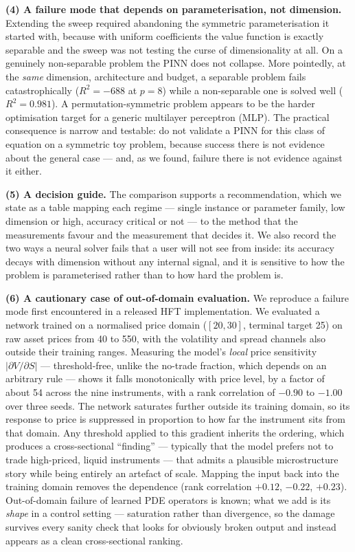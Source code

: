 \documentclass[conference]{IEEEtran}
\begin{document}
\textbf{(4) A failure mode that depends on parameterisation, not dimension.} Extending the sweep
required abandoning the symmetric parameterisation it started with, because with uniform
coefficients the value function is exactly separable and the sweep was not testing the
curse of dimensionality at all. On a genuinely non-separable problem the PINN does not collapse.
More pointedly, at the \emph{same} dimension, architecture and budget, a separable problem fails
catastrophically ($R^2 = -688$ at $p=8$) while a non-separable one is solved well
($R^2 = 0.981$). A permutation-symmetric problem appears to be the harder optimisation target for
a generic multilayer perceptron (MLP). The practical consequence is narrow and testable: do not
validate a PINN for this
class of equation on a symmetric toy problem, because success there is not evidence about the
general case --- and, as we found, failure there is not evidence against it either.

\textbf{(5) A decision guide.} The comparison supports a recommendation, which we state as a table
mapping each regime --- single instance or parameter family, low dimension or high, accuracy
critical or not --- to the method that the measurements favour and the measurement that decides it.
We also record the two ways a neural solver fails that a user will not see from inside: its
accuracy decays with dimension without any internal signal, and it is sensitive to how the problem
is parameterised rather than to how hard the problem is.

\textbf{(6) A cautionary case of out-of-domain evaluation.} We reproduce a failure mode first
encountered in a released HFT implementation. We evaluated a network trained on a normalised price
domain ($[20,30]$, terminal target 25) on raw asset prices from 40 to 550,
with the volatility and spread channels also outside their training ranges. Measuring the
model's \emph{local} price sensitivity $|\partial V/\partial S|$ --- threshold-free, unlike the
no-trade fraction, which depends on an arbitrary rule --- shows it falls monotonically with
price level, by a factor of about 54 across the nine instruments, with a rank correlation of
$-0.90$ to $-1.00$ over three seeds. The network saturates further outside its training
domain, so its response to price is suppressed in proportion to how far the instrument sits
from that domain. Any threshold applied to this gradient inherits the ordering, which produces
a cross-sectional ``finding'' --- typically that the model prefers not to trade high-priced,
liquid instruments --- that admits a plausible microstructure story while being entirely an
artefact of scale. Mapping the input back into the training domain removes the dependence
(rank correlation $+0.12$, $-0.22$, $+0.23$). Out-of-domain failure of learned PDE operators is
known; what we add is its \emph{shape} in a control setting --- saturation rather than divergence,
so the damage survives every sanity check that looks for obviously broken output and instead
appears as a clean cross-sectional ranking.
\end{document}
